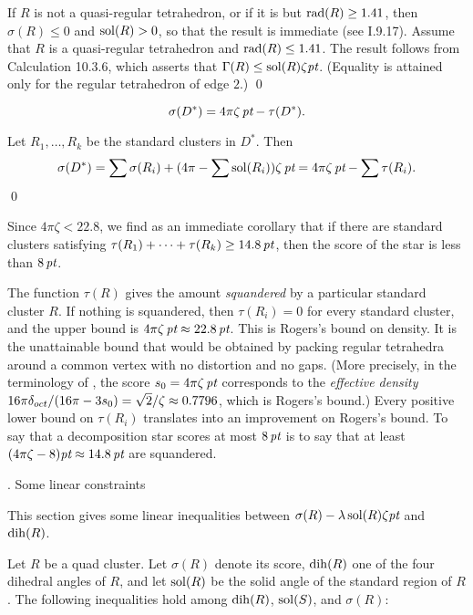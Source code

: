   If $R$ is not a quasi-regular tetrahedron, or
if it is but $\operatorname{rad}(R)\ge1.41$, then
$\sigma(R)\le0$ and $\operatorname{sol}(R)> 0$, so that the result is immediate
(see I.9.17).
Assume that $R$ is a 
quasi-regular tetrahedron and $\operatorname{rad}(R)\le 1.41$.  
  The result follows from
Calculation 10.3.6, which asserts that $\Gamma(R)\le \operatorname{sol}(R)\zeta\hbox{\it pt}$.
(Equality is attained only for the regular tetrahedron of edge $2$.)
  \qed
\enddemo

$$\sigma(D^*) = {4\pi \zeta\,\hbox{\it pt}} - \tau(D^*).$$
\endproclaim

Let $R_1,\ldots,R_k$ be the standard clusters in $D^*$. Then 
$$\sigma(D^*) = \sum\sigma(R_i) + (4\pi-\sum\operatorname{sol}(R_i))\zeta\,\hbox{\it pt} = 4\pi \zeta\,\hbox{\it pt} - \sum\tau(R_i).$$
\qed
\enddemo


Since $4\pi \zeta< 22.8$, we find as an immediate corollary that
if there are standard clusters satisfying $\tau(R_1)+\cdots+\tau(R_k)\ge14.8\,\hbox{\it pt}$,
then the score of the star is less than $8\,\hbox{\it pt}$.


The function $\tau(R)$ gives the amount {\it squandered\/} by 
a particular standard cluster $R$.  If nothing is squandered,
then $\tau(R_i)=0$ for every standard cluster, and the upper bound
is $4\pi \zeta\,\hbox{\it pt}\approx 22.8\,\hbox{\it pt}$.  
This is Rogers's bound
on density.  It is the unattainable bound that would
be obtained by 
packing regular tetrahedra around a common vertex with no distortion and
no gaps.
(More precisely, in the terminology of \cite{H1}, the score 
$s_0=4\pi \zeta\,\hbox{\it pt}$
corresponds to the {\it effective density\/}
 $16\pi\delta_{oct}/(16\pi- 3 s_0)  =\sqrt{2}/\zeta \approx 0.7796$, 
which is Rogers's bound.)  Every positive lower bound
on $\tau(R_i)$ translates into an improvement on Rogers's bound.
 To say that a decomposition star scores at most $8\,\hbox{\it pt}$
is to say that at least
$(4\pi \zeta-8)\hbox{\it pt}\approx 14.8\,\hbox{\it pt}$ are squandered.


. Some linear constraints\endhead

This section gives some linear inequalities between
$\sigma(R)-\lambda \operatorname{sol}(R)\zeta\hbox{\it pt}$ and
$\operatorname{dih}(R)$.

  Let $R$ be a quad cluster.
  Let $\sigma(R)$ denote its score,
$\operatorname{dih}(R)$ one of the four dihedral angles of $R$,
 and let $\operatorname{sol}(R)$ be the solid angle of the
standard region of $R$.  The following inequalities hold among
$\operatorname{dih}(R)$, $\operatorname{sol}(S)$,  and $\sigma(R)$:
\endproclaim

